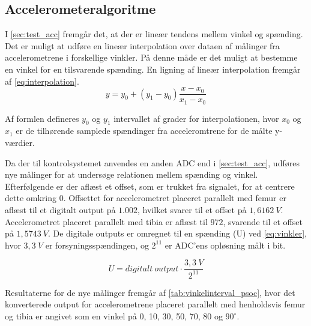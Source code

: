 \subsection{Accelerometeralgoritme}\label{sec:imp_vinkler}
I \autoref{sec:test_acc} fremgår det, at der er lineær tendens mellem vinkel og spænding. Det er muligt at udføre en lineær interpolation over dataen af målinger fra accelerometrene i forskellige vinkler. På denne måde er det muligt at bestemme en vinkel for en tilsvarende spænding. En ligning af lineær interpolation fremgår af \autoref{eq:interpolation}.
\begin{equation} \label{eq:interpolation}
y=y_{0}+(y_{1}-y_{0})\dfrac{x-x_{0}}{x_{1}-x_{0}}
\end{equation}

\noindent
Af formlen defineres $y_0$ og $y_1$ intervallet af grader for interpolationen, hvor $x_0$ og $x_1$ er de tilhørende samplede spændinger fra acceleromtrene for de målte y-værdier.   

Da der til kontrolsystemet anvendes en anden ADC end i \autoref{sec:test_acc}, udføres nye målinger for at undersøge relationen mellem spænding og vinkel.  
Efterfølgende er der aflæst et offset, som er trukket fra signalet, for at centrere dette omkring 0. Offsettet for accelerometret placeret parallelt med femur er aflæst til et digitalt output på $1.002$, hvilket svarer til et offset på $1,6162~V$. Accelerometret placeret parallelt med tibia er aflæst til $972$, svarende til et offset på $1,5743~V$. De digitale outputs er omregnet til en spænding (U) ved \autoref{eq:vinkler}, hvor $3,3~V$ er forsyningsspændingen, og $2^{11}$ er ADC'ens opløsning målt i bit.  

\begin{equation}
\label{eq:vinkler}
U = digitalt~output\cdot \dfrac{3,3~V}{2^{11}}
\end{equation}

\noindent
Resultaterne for de nye målinger fremgår af \autoref{tab:vinkelinterval_psoc}, hvor det konverterede output for accelerometrene placeret parallelt med henholdsvis femur og tibia er angivet som en vinkel på 0, 10, 30, 50, 70, 80 og $90^{\circ}$. 

